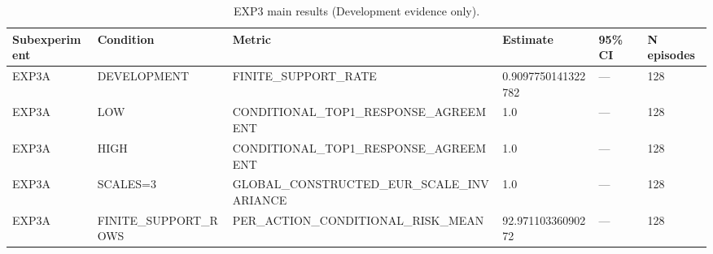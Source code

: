 \begin{table}[ht]
\caption{EXP3 main results (Development evidence only).}
\centering
\begin{tabular}{llllll}
\toprule
Subexperiment & Condition & Metric & Estimate & 95\% CI & N episodes \\
\midrule
EXP3A & DEVELOPMENT & FINITE\_SUPPORT\_RATE & 0.9097750141322782 & — & 128 \\
EXP3A & LOW & CONDITIONAL\_TOP1\_RESPONSE\_AGREEMENT & 1.0 & — & 128 \\
EXP3A & HIGH & CONDITIONAL\_TOP1\_RESPONSE\_AGREEMENT & 1.0 & — & 128 \\
EXP3A & SCALES=3 & GLOBAL\_CONSTRUCTED\_EUR\_SCALE\_INVARIANCE & 1.0 & — & 128 \\
EXP3A & FINITE\_SUPPORT\_ROWS & PER\_ACTION\_CONDITIONAL\_RISK\_MEAN & 92.97110336090272 & — & 128 \\
\bottomrule
\end{tabular}
\end{table}
